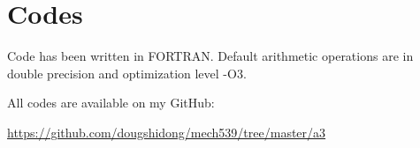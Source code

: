 \documentclass[letterpaper,12pt,]{article}
\begin{document}
\section*{Codes}

Code has been written in FORTRAN. Default arithmetic operations are in double precision and optimization level -O3.

All codes are available on my GitHub:

\url{https://github.com/dougshidong/mech539/tree/master/a3}
\end{document}

